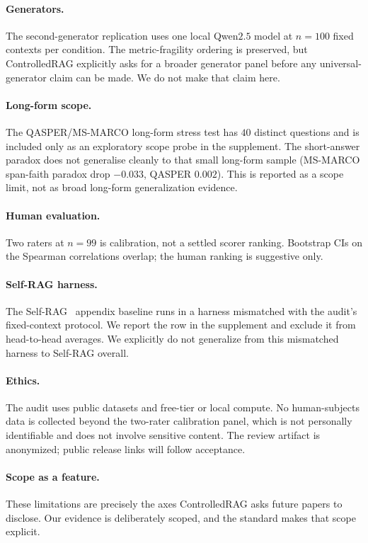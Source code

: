 \paragraph{Generators.} The second-generator replication uses one
local Qwen$2.5$ model at $n=100$ fixed contexts per condition. The
metric-fragility ordering is preserved, but ControlledRAG explicitly
asks for a broader generator panel before any universal-generator claim
can be made. We do not make that claim here.

\paragraph{Long-form scope.} The QASPER/MS-MARCO long-form stress test
has $40$ distinct questions and is included only as an exploratory
scope probe in the supplement. The short-answer paradox does not
generalise cleanly to that small long-form sample (MS-MARCO span-faith
paradox drop $-0.033$, QASPER $0.002$). This is reported as a scope
limit, not as broad long-form generalization evidence.

\paragraph{Human evaluation.} Two raters at $n=99$ is calibration, not
a settled scorer ranking. Bootstrap CIs on the Spearman correlations
overlap; the human ranking is suggestive only.

\paragraph{Self-RAG harness.} The Self-RAG~\citep{asai2024selfrag}
appendix baseline runs in a harness mismatched with the audit's
fixed-context protocol. We report the row in the supplement and
exclude it from head-to-head averages. We explicitly do not generalize
from this mismatched harness to Self-RAG overall.

\paragraph{Ethics.} The audit uses public datasets and free-tier or
local compute. No human-subjects data is collected beyond the two-rater
calibration panel, which is not personally identifiable and does not
involve sensitive content. The review artifact is anonymized; public
release links will follow acceptance.

\paragraph{Scope as a feature.} These limitations are precisely the
axes ControlledRAG asks future papers to disclose. Our evidence is
deliberately scoped, and the standard makes that scope explicit.

